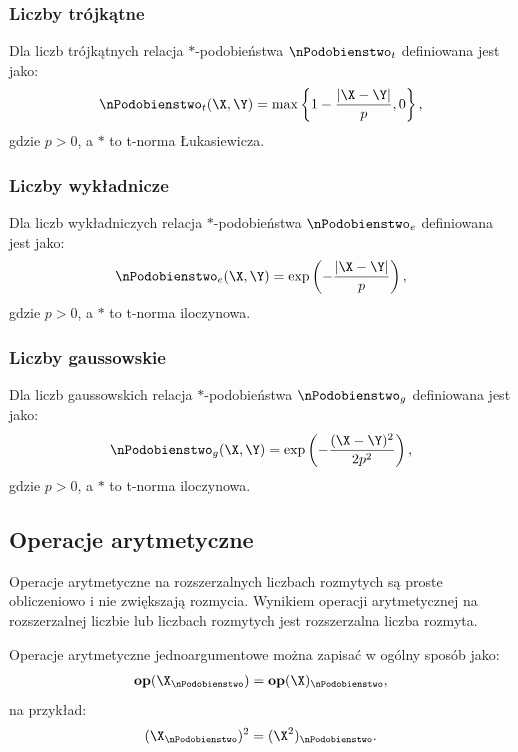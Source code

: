 \documentclass[a4paper,twoside,12pt]{book}
\begin{document}
\subsubsection{Liczby trójkątne}

Dla liczb trójkątnych relacja $\ast$-podobieństwa $\nPodobienstwo_{t}$ definiowana jest jako:
\begin{align}
	\label{eq:similarity_t}
	\nPodobienstwo_{t}(\X,\Y) = \max \left\{1 - \frac{|\X-\Y|}{p}, 0 \right\},
\end{align}
gdzie $p > 0$, a $\ast$ to t-norma Łukasiewicza.

\subsubsection{Liczby wykładnicze}

Dla liczb wykładniczych relacja $\ast$-podobieństwa $\nPodobienstwo_{e}$ definiowana jest jako:
\begin{align}
	\label{eq:similarity_e}
	\nPodobienstwo_{e}(\X,\Y) = \exp \left(- \frac{|\X-\Y|}{p} \right),
\end{align}
gdzie $p > 0$, a $\ast$ to t-norma iloczynowa. 

\subsubsection{Liczby gaussowskie}

Dla liczb gaussowskich relacja $\ast$-podobieństwa $\nPodobienstwo_{g}$ definiowana jest jako:
\begin{align}
	\label{eq:similarity_g}
	\nPodobienstwo_{g}(\X,\Y) = \exp \left(- \frac{(\X-\Y)^{2}}{2p^{2}} \right),
\end{align}
gdzie $p > 0$, a $\ast$ to t-norma iloczynowa.

\subsection{Operacje arytmetyczne}

Operacje arytmetyczne na rozszerzalnych liczbach rozmytych są proste obliczeniowo i nie zwiększają rozmycia. Wynikiem operacji arytmetycznej na rozszerzalnej liczbie lub liczbach rozmytych jest rozszerzalna liczba rozmyta.

Operacje arytmetyczne jednoargumentowe można zapisać w ogólny sposób jako:
\begin{align}
	\label{eq:fuzzy-arithmetics-one-argument}
	\mathbf{op}(\X_{\nPodobienstwo}) = \mathbf{op}(\X)_{\nPodobienstwo},
\end{align}
na przykład:
\begin{align}
	(\X_{\nPodobienstwo})^{2} = (\X^{2})_{\nPodobienstwo}.
\end{align}
\end{document}
